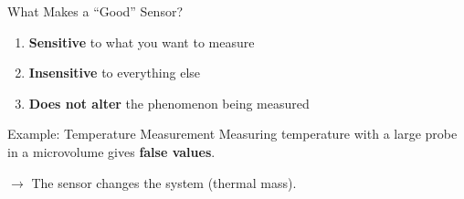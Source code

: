 \documentclass[aspectratio=169,11pt]{beamer}
\begin{document}
\begin{frame}{What Makes a ``Good'' Sensor?}
    \begin{enumerate}
        \item \textbf{Sensitive} to what you want to measure
        \item \textbf{Insensitive} to everything else
        \item \textbf{Does not alter} the phenomenon being measured
    \end{enumerate}
    
    \vspace{0.5cm}
    \begin{exampleblock}{Example: Temperature Measurement}
        Measuring temperature with a large probe in a microvolume gives \textbf{false values}.
        
        \vspace{0.2cm}
        $\rightarrow$ The sensor changes the system (thermal mass).
    \end{exampleblock}
    
    \vspace{0.3cm}
    \footnotesize
    \cite{fraden2016handbook}
\end{frame}
\end{document}
